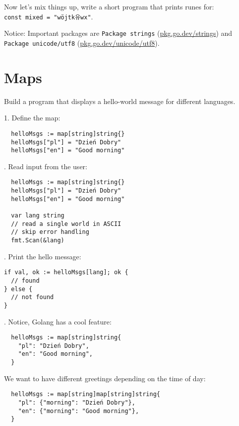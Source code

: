 \documentclass[11pt, letterpaper]{article}
\begin{document}
Now let's mix things up, write a short program that prints runes for:\\ \texttt{const mixed = "wöjtk유wx"}.

\bigskip
Notice: Important packages are \verb|Package strings| (\href{https://pkg.go.dev/strings}{pkg.go.dev/strings}) and \verb|Package unicode/utf8| (\href{https://pkg.go.dev/unicode/utf8}{pkg.go.dev/unicode/utf8}).

\section{Maps}

Build a program that displays a hello-world message for different languages.

1. Define the map:

\begin{verbatim}
  helloMsgs := map[string]string{}
  helloMsgs["pl"] = "Dzień Dobry"
  helloMsgs["en"] = "Good morning"
\end{verbatim}

. Read input from the user:

\begin{verbatim}
  helloMsgs := map[string]string{}
  helloMsgs["pl"] = "Dzień Dobry"
  helloMsgs["en"] = "Good morning"

  var lang string
  // read a single world in ASCII
  // skip error handling
  fmt.Scan(&lang)
\end{verbatim}

. Print the hello message:

\begin{verbatim}
if val, ok := helloMsgs[lang]; ok {
  // found
} else {
  // not found
}
\end{verbatim}

. Notice, Golang has a cool feature:

\begin{verbatim}
  helloMsgs := map[string]string{
    "pl": "Dzień Dobry",
    "en": "Good morning",
  }
\end{verbatim}

We want to have different greetings depending on the time of day:

\begin{verbatim}
  helloMsgs := map[string]map[string]string{
    "pl": {"morning": "Dzień Dobry"},
    "en": {"morning": "Good morning"},
  }
\end{verbatim}
\end{document}
